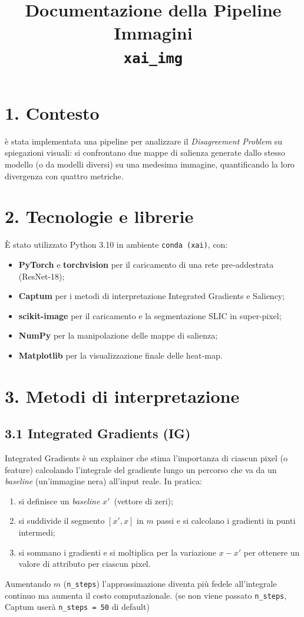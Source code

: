 \documentclass[a4paper,11pt]{article}
\title{Documentazione della Pipeline Immagini \\ \texttt{xai\_img}}
\begin{document}
\maketitle

\section*{1. Contesto}
è stata implementata una pipeline per analizzare il \emph{Disagreement Problem} su spiegazioni visuali: si confrontano due mappe di salienza generate dallo stesso modello (o da modelli diversi) su una medesima immagine, quantificando la loro divergenza con quattro metriche.

\section*{2. Tecnologie e librerie}
È stato utilizzato Python 3.10 in ambiente \texttt{conda (xai)}, con:
\begin{itemize}
  \item \textbf{PyTorch} e \textbf{torchvision} per il caricamento di una rete pre‐addestrata (ResNet-18);
  \item \textbf{Captum} per i metodi di interpretazione Integrated Gradients e Saliency;
  \item \textbf{scikit-image} per il caricamento e la segmentazione SLIC in super‐pixel;
  \item \textbf{NumPy} per la manipolazione delle mappe di salienza;
  \item \textbf{Matplotlib} per la visualizzazione finale delle heat‐map.
\end{itemize}

\section*{3. Metodi di interpretazione}
\subsection*{3.1 Integrated Gradients (IG)}
Integrated Gradients è un explainer che stima l’importanza di ciascun pixel (o feature) calcolando l’integrale del gradiente lungo un percorso che va da un \emph{baseline} (un’immagine nera) all’input reale.  
In pratica:
\begin{enumerate}
  \item si definisce un \emph{baseline} $x'\,$ (vettore di zeri);
  \item si suddivide il segmento $[x',x]$ in $m$ passi e si calcolano i gradienti in punti intermedi;
  \item si sommano i gradienti e si moltiplica per la variazione $x - x'$ per ottenere un valore di attributo per ciascun pixel.
\end{enumerate}
Aumentando $m$ (\texttt{n\_steps}) l’approssimazione diventa più fedele all’integrale continuo ma aumenta il costo computazionale. (se non viene passato \texttt{n\_steps}, Captum userà \texttt{n\_steps = 50} di default)
\end{document}

